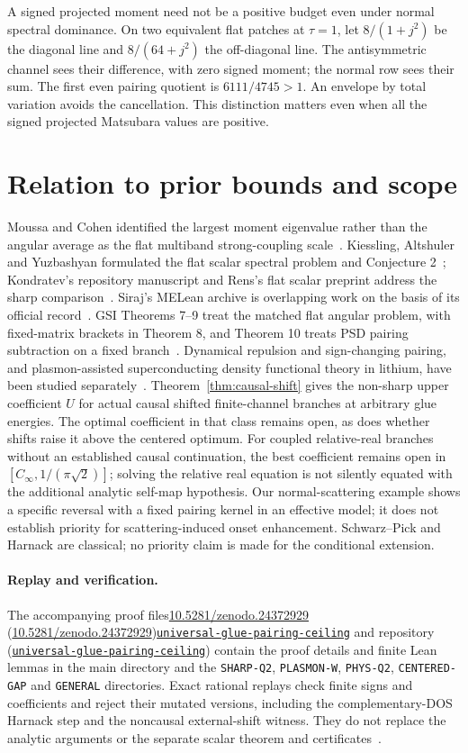 \documentclass[11pt]{article}
\newcommand{\Cinf}{C_\infty}
\newcommand*{\UNIVGLUESUPPDOI}{\href{https://doi.org/10.5281/zenodo.24372929}{\mbox{10.5281/zenodo.24372929}}}
\newcommand*{\UNIVGLUEREPO}{\href{https://github.com/SuperMatics-Inc/universal-glue-pairing-ceiling}{\texttt{universal-glue-pairing-ceiling}}}
\newcommand{\ifstaged}[3]{\ifx#1\empty #3\else #2\fi}
\begin{document}
A signed projected moment need not be a positive budget even under normal spectral dominance. On two equivalent flat patches at $\tau=1$, let $8/(1+j^2)$ be the diagonal line and $8/(64+j^2)$ the off-diagonal line. The antisymmetric channel sees their difference, with zero signed moment; the normal row sees their sum. The first even pairing quotient is $6111/4745>1$. An envelope by total variation avoids the cancellation. This distinction matters even when all the signed projected Matsubara values are positive.

\section{Relation to prior bounds and scope}
Moussa and Cohen identified the largest moment eigenvalue rather than the angular average as the flat multiband strong-coupling scale~\cite{moussa}. Kiessling, Altshuler and Yuzbashyan formulated the flat scalar spectral problem and Conjecture 2~\cite{kay}; Kondratev's repository manuscript and Rens's flat scalar preprint address the sharp comparison~\cite{kondratev,rens}. Siraj's MELean archive is overlapping work on the basis of its official record~\cite{siraj}. GSI Theorems 7--9 treat the matched flat angular problem, with fixed-matrix brackets in Theorem 8, and Theorem 10 treats PSD pairing subtraction on a fixed branch~\cite{gsi}. Dynamical repulsion and sign-changing pairing, and plasmon-assisted superconducting density functional theory in lithium, have been studied separately~\cite{pimenov,akashi}. Theorem~\ref{thm:causal-shift} gives the non-sharp upper coefficient $U$ for actual causal shifted finite-channel branches at arbitrary glue energies. The optimal coefficient in that class remains open, as does whether shifts raise it above the centered optimum. For coupled relative-real branches without an established causal continuation, the best coefficient remains open in $[\Cinf,1/(\pi\sqrt2)]$; solving the relative real equation is not silently equated with the additional analytic self-map hypothesis. Our normal-scattering example shows a specific reversal with a fixed pairing kernel in an effective model; it does not establish priority for scattering-induced onset enhancement. Schwarz--Pick and Harnack are classical; no priority claim is made for the conditional extension.

\paragraph{Replay and verification.}
The accompanying proof files\ifstaged{\UNIVGLUESUPPDOI}{ (\UNIVGLUESUPPDOI)}{}\ifstaged{\UNIVGLUEREPO}{ and repository (\UNIVGLUEREPO)}{} contain the proof details and finite Lean lemmas in the main directory and the \texttt{SHARP-Q2}, \texttt{PLASMON-W}, \texttt{PHYS-Q2}, \texttt{CENTERED-GAP} and \texttt{GENERAL} directories. Exact rational replays check finite signs and coefficients and reject their mutated versions, including the complementary-DOS Harnack step and the noncausal external-shift witness. They do not replace the analytic arguments or the separate scalar theorem and certificates~\cite{finite}.


\end{document}
